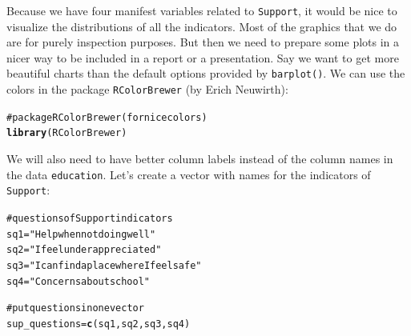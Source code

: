 \documentclass[12pt]{book}\usepackage{graphicx, color}
\makeatletter
\newcommand{\hlfunctioncall}[1]{\textcolor[rgb]{0.501960784313725,0,0.329411764705882}{\textbf{#1}}}%
\newcommand{\hlstring}[1]{\textcolor[rgb]{0.6,0.6,1}{#1}}%
\newcommand{\hlcomment}[1]{\textcolor[rgb]{0.180392156862745,0.6,0.341176470588235}{#1}}%
\newenvironment{kframe}{%
 \def\at@end@of@kframe{}%
 \ifinner\ifhmode%
  \def\at@end@of@kframe{\end{minipage}}%
  \begin{minipage}{\columnwidth}%
 \fi\fi%
 \def\FrameCommand##1{\hskip\@totalleftmargin \hskip-\fboxsep
 \colorbox{shadecolor}{##1}\hskip-\fboxsep
     \hskip-\linewidth \hskip-\@totalleftmargin \hskip\columnwidth}%
 \MakeFramed {\advance\hsize-\width
   \@totalleftmargin\z@ \linewidth\hsize
   \@setminipage}}%
 {\par\unskip\endMakeFramed%
 \at@end@of@kframe}
\newenvironment{knitrout}{}{} %
\newcommand{\code}[1]{\texttt{#1}}
\makeatother
\begin{document}
Because we have four manifest variables related to \code{Support}, it would be nice to visualize the distributions of all the indicators. Most of the graphics that we do are for purely inspection purposes. But then we need to prepare some plots in a nicer way to be included in a report or a presentation. Say we want to get more beautiful charts than the default options provided by \code{barplot()}. We can use the colors in the package \code{RColorBrewer} (by Erich Neuwirth):
\begin{knitrout}
\color{fgcolor}\begin{kframe}
\begin{alltt}
\hlcomment{# package RColorBrewer (for nice colors)}
\hlfunctioncall{library}(RColorBrewer)
\end{alltt}
\end{kframe}
\end{knitrout}


We will also need to have better column labels instead of the column names in the data \code{education}. Let's create a vector with names for the indicators of \code{Support}:
\begin{knitrout}
\color{fgcolor}\begin{kframe}
\begin{alltt}
\hlcomment{# questions of Support indicators}
sq1 = \hlstring{"Help when not doing well"}
sq2 = \hlstring{"I feel underappreciated"}
sq3 = \hlstring{"I can find a place where I feel safe"}
sq4 = \hlstring{"Concerns about school"}

\hlcomment{# put questions in one vector}
sup_questions = \hlfunctioncall{c}(sq1, sq2, sq3, sq4)
\end{alltt}
\end{kframe}
\end{knitrout}
\end{document}
